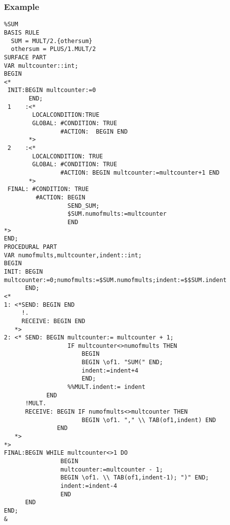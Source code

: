 \subsubsection{Example}
\begin{verbatim}
%SUM
BASIS RULE
  SUM = MULT/2.{othersum}
  othersum = PLUS/1.MULT/2
SURFACE PART
VAR multcounter::int;
BEGIN
<*
 INIT:BEGIN multcounter:=0
       END;
 1    :<*
        LOCALCONDITION:TRUE
        GLOBAL: #CONDITION: TRUE
                #ACTION:  BEGIN END
       *>
 2    :<*
        LOCALCONDITION: TRUE
        GLOBAL: #CONDITION: TRUE
                #ACTION: BEGIN multcounter:=multcounter+1 END
       *>
 FINAL: #CONDITION: TRUE
         #ACTION: BEGIN
                  SEND_SUM;
                  $SUM.numofmults:=multcounter
                  END
*>
END;
PROCEDURAL PART
VAR numofmults,multcounter,indent::int;
BEGIN
INIT: BEGIN multcounter:=0;numofmults:=$SUM.numofmults;indent:=$$SUM.indent
      END;
<*
1: <*SEND: BEGIN END
     !.
     RECEIVE: BEGIN END
   *>
2: <* SEND: BEGIN multcounter:= multcounter + 1;
                  IF multcounter<>numofmults THEN
                      BEGIN
                      BEGIN \of1. "SUM(" END;
                      indent:=indent+4
                      END;
                  %%MULT.indent:= indent
            END
      !MULT.
      RECEIVE: BEGIN IF numofmults<>multcounter THEN
                      BEGIN \of1. "," \\ TAB(of1,indent) END
               END
   *>
*>
FINAL:BEGIN WHILE multcounter<>1 DO
                BEGIN
                multcounter:=multcounter - 1;
                BEGIN \of1. \\ TAB(of1,indent-1); ")" END;
                indent:=indent-4
                END
      END
END;
&
\end{verbatim}
